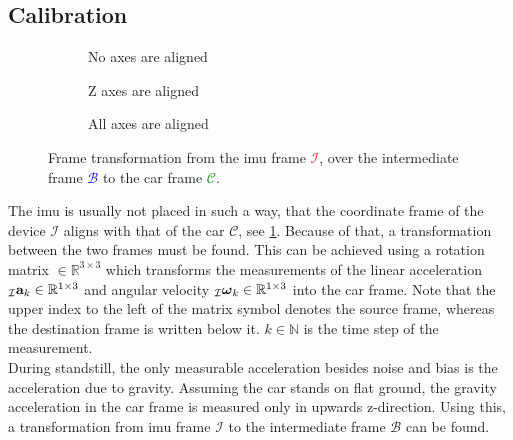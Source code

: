 \subsection{Calibration}
\label{ssec:calibration_imu}
\begin{figure}[htb]
	\centering
	\begin{subfigure}[b]{0.3\textwidth}
		\centering
		
		\caption{No axes are aligned}
		\label{fig:tikz_frame_transformation_init}
	\end{subfigure}
	\hfill
	\begin{subfigure}[b]{0.3\textwidth}
		\centering
		
		\caption{Z axes are aligned}
		\label{fig:tikz_frame_transformation_intermediate}
	\end{subfigure}
	\hfill
	\begin{subfigure}[b]{0.3\textwidth}
		\centering
		
		\caption{All axes are aligned}
		\label{fig:tikz_frame_transformation_final}
	\end{subfigure}
	\caption[Frame transformation]{Frame transformation from the \gls{imu} frame \textcolor{red}{$\mathcal{I}$}, over the intermediate frame \textcolor{blue}{$\mathcal{B}$} to the car frame \textcolor{green}{$\mathcal{C}$}.}
	\label{fig:tikz_frame_transformation}
\end{figure}
The \gls{imu} is usually not placed in such a way, that the coordinate frame of the device $\mathcal{I}$ aligns with that of the car $\mathcal{C}$, see \cref{fig:tikz_frame_transformation_init}.
Because of that, a transformation between the two frames must be found.
This can be achieved using a rotation matrix  $\in \mathbb{R}^{3\times3}$ which transforms the measurements of the linear acceleration $\vincs{a}{I}_k \in \mathbb{R}^{1\times3}$ and angular velocity ${\vincs{\boldsymbol{\omega}}{I}_k \in \mathbb{R}^{1\times3}}$ into the car frame.
Note that the upper index to the left of the matrix symbol denotes the source frame, whereas the destination frame is written below it.
$k \in \mathbb{N}$ is the time step of the measurement.\\
During standstill, the only measurable acceleration besides noise and bias is the acceleration due to gravity.
Assuming the car stands on flat ground, the gravity acceleration in the car frame is measured only in upwards z-direction.
Using this, a transformation from \gls{imu} frame $\mathcal{I}$ to the intermediate frame $\mathcal{B}$ can be found.
